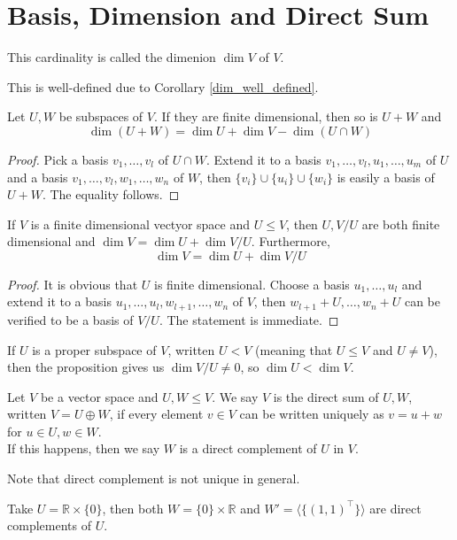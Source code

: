 \section{Basis, Dimension and Direct Sum}
\begin{definition}
    This cardinality is called the dimenion $\dim V$ of $V$.
\end{definition}
This is well-defined due to Corollary \ref{dim_well_defined}.
\begin{proposition}
    Let $U,W$ be subspaces of $V$.
    If they are finite dimensional, then so is $U+W$ and
    $$\dim(U+W)=\dim U+\dim V-\dim(U\cap W)$$
\end{proposition}
\begin{proof}
    Pick a basis $v_1,\ldots,v_l$ of $U\cap W$.
    Extend it to a basis $v_1,\ldots,v_l,u_1,\ldots,u_m$ of $U$ and a basis $v_1,\ldots,v_l,w_1,\ldots,w_n$ of $W$, then $\{v_i\}\cup\{u_i\}\cup\{w_i\}$ is easily a basis of $U+W$.
    The equality follows.
\end{proof}
\begin{proposition}
    If $V$ is a finite dimensional vectyor space and $U\le V$, then $U,V/U$ are both finite dimensional and $\dim V=\dim U+\dim V/U$.
    Furthermore,
    $$\dim V=\dim U+\dim V/U$$
\end{proposition}
\begin{proof}
    It is obvious that $U$ is finite dimensional.
    Choose a basis $u_1,\ldots,u_l$ and extend it to a basis $u_1,\ldots,u_l,w_{l+1},\ldots,w_n$ of $V$, then $w_{l+1}+U,\ldots,w_n+U$ can be verified to be a basis of $V/U$.
    The statement is immediate.
\end{proof}
\begin{remark}
    If $U$ is a proper subspace of $V$, written $U<V$ (meaning that $U\le V$ and $U\neq V$), then the proposition gives us $\dim V/U\neq 0$, so $\dim U<\dim V$.
\end{remark}
\begin{definition}
    Let $V$ be a vector space and $U,W\le V$.
    We say $V$ is the direct sum of $U,W$, written $V=U\oplus W$, if every element $v\in V$ can be written uniquely as $v=u+w$ for $u\in U,w\in W$.\\
    If this happens, then we say $W$ is a direct complement of $U$ in $V$.
\end{definition}
Note that direct complement is not unique in general.
\begin{example}
    Take $U=\mathbb R\times \{0\}$, then both $W=\{0\}\times \mathbb R$ and $W'=\langle\{(1,1)^\top\}\rangle$ are direct complements of $U$.
\end{example}

